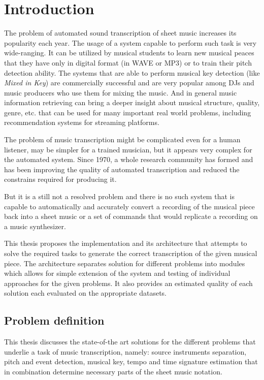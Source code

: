\chapter{Introduction}\label{ch:introduction}

The problem of automated sound transcription of sheet music increases its popularity each year. The usage of a system
capable to perform such task is very wide-ranging. It can be utilized by musical students to learn new musical peaces
that they have only in digital format (in \ac{WAVE} or MP3) or to train their pitch detection ability. The systems that
are able to perform musical key detection (like \textit{Mixed in Key}\cite{mixed-in-keys}) are commercially successful
and are very popular among DJs and music producers who use them for mixing the music. And in general music information
retrieving can bring a deeper insight about musical structure, quality, genre, etc. that can be used for many important
real world problems, including recommendation systems for streaming platforms.

The problem of music transcription might be complicated even for a human listener, may be simpler for a trained
musician, but it appears very complex for the automated system. Since 1970, a whole research community has formed
and has been improving the quality of automated transcription and reduced the constrains required for producing it.

But it is a still not a resolved problem and there is no such system that is capable to automatically and accurately
convert a recording of the musical piece back into a sheet music or a set of commands that would replicate a recording
on a music synthesizer.

This thesis proposes the implementation and its architecture that attempts to solve the required tasks to generate
the correct transcription of the given musical piece. The architecture separates solution for different problems into
modules which allows for simple extension of the system and testing of individual approaches for the given problems.
It also provides an estimated quality of each solution each evaluated on the appropriate datasets.

\section{Problem definition}\label{sec:problem-definition}

This thesis discusses the state-of-the art solutions for the different problems that underlie a task of music
transcription, namely: source instruments separation, pitch and event detection, musical key, tempo and time signature
estimation that in combination determine necessary parts of the sheet music notation.


